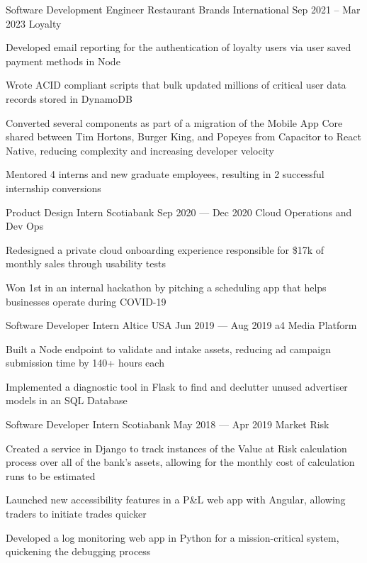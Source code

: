 \begin{cventries}
  \cventry
      {Software Development Engineer}
      {Restaurant Brands International}
      {}
      {Sep 2021 -- Mar 2023}
      {Loyalty}
      {
        \begin{cvitems}
          \item {Developed email reporting for the authentication of loyalty users via user saved payment methods in Node}
          \item {Wrote ACID compliant scripts that bulk updated millions of critical user data records stored in DynamoDB}
          \item {Converted several components as part of a migration of the Mobile App Core shared between Tim Hortons, Burger King, and Popeyes from Capacitor to React Native, reducing complexity and increasing developer velocity}
          \item {Mentored 4 interns and new graduate employees, resulting in 2 successful internship conversions}
        \end{cvitems}
      }
  \cventry
    {Product Design Intern}
    {Scotiabank}
    {}
    {Sep 2020 --- Dec 2020}
    {Cloud Operations and Dev Ops}
    {
      \begin{cvitems}
        \item {Redesigned a private cloud onboarding experience responsible for \$17k of monthly sales through usability tests}
        \item {Won 1st in an internal hackathon by pitching a scheduling app that helps businesses operate during COVID-19}
      \end{cvitems}
    }

  \cventry
    {Software Developer Intern}
    {Altice USA}
    {}
    {Jun 2019 --- Aug 2019}
    {a4 Media Platform}
    {
    \begin{cvitems}
      \item {Built a Node endpoint to validate and intake assets, reducing ad campaign submission time by 140+ hours each}
      \item {Implemented a diagnostic tool in Flask to find and declutter unused advertiser models in an SQL Database}
    \end{cvitems}
    }

  \cventry
    {Software Developer Intern}
    {Scotiabank}
    {}
    {May 2018 --- Apr 2019}
    {Market Risk}
    {
      \begin{cvitems}
        \item {Created a service in Django to track instances of the Value at Risk calculation process over all of the bank's assets, allowing for the monthly cost of calculation runs to be estimated}
        \item {Launched new accessibility features in a P\&L web app with Angular, allowing traders to initiate trades quicker}
        \item {Developed a log monitoring web app in Python for a mission-critical system, quickening the debugging process}
      \end{cvitems}
    }
\end{cventries}
